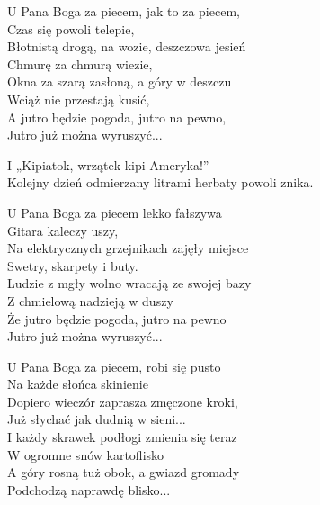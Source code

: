 \begin{text}
    U Pana Boga za piecem, jak to za piecem,\\
    Czas się powoli telepie,\\
    Błotnistą drogą, na wozie, deszczowa jesień\\
    Chmurę za chmurą wiezie,\\
    Okna za szarą zasłoną, a góry w deszczu\\
    Wciąż nie przestają kusić,\\
    A jutro będzie pogoda, jutro na pewno,\\
    Jutro już można wyruszyć...

    I „Kipiatok, wrzątek kipi Ameryka!”\\
    Kolejny dzień odmierzany litrami herbaty powoli znika.

    U Pana Boga za piecem lekko fałszywa\\
    Gitara kaleczy uszy,\\
    Na elektrycznych grzejnikach zajęły miejsce\\
    Swetry, skarpety i buty.\\
    Ludzie z mgły wolno wracają ze swojej bazy\\
    Z chmielową nadzieją w duszy\\
    Że jutro będzie pogoda, jutro na pewno\\
    Jutro już można wyruszyć...

    U Pana Boga za piecem, robi się pusto\\
    Na każde słońca skinienie\\
    Dopiero wieczór zaprasza zmęczone kroki,\\
    Już słychać jak dudnią w sieni...\\
    I każdy skrawek podłogi zmienia się teraz\\
    W ogromne snów kartoflisko\\
    A góry rosną tuż obok, a gwiazd gromady\\
    Podchodzą naprawdę blisko...
\end{text}
\begin{chord}

\end{chord}